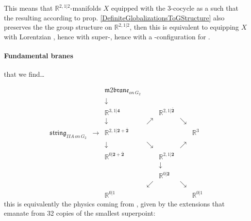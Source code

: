 \documentclass[12pt,titlepage]{article}
\newcommand{\itexarray}[1]{\begin{matrix}#1\end{matrix}}
\theoremstyle{plain}
\theoremstyle{definition}
\theoremstyle{remark}
\begin{document}
This means that $\mathbb{R}^{2,1|2}$-manifolds $X$ equipped with the 3-cocycle as a  such that the resulting  according to prop. \ref{DefiniteGlobalizationsToGStructure} also preserves the the group structure on $\mathbb{R}^{2,1|2}$, then this is equivalent to equipping $X$ with Lorentzian , hence with super-, hence with a -configuration for .

\hypertarget{fundamental_branes}{}\paragraph*{{Fundamental branes}}\label{fundamental_branes}

 that we find\ldots{}

\begin{displaymath}
\itexarray{
     && \mathfrak{m}2\mathfrak{brane}_{on\,G_2}
     \\
     && \downarrow
     \\
     && \mathbb{R}^{3,1|\mathbf{4}}  &&  \mathbb{R}^{2,1|\overline{\mathbf{2}}}
     \\
     && \downarrow & \nearrow&  & \searrow
     \\
     \mathfrak{string}_{IIA\,on\,G_2} &\longrightarrow& \mathbb{R}^{2,1|\mathbf{2}+\overline{\mathbf{2}}} &&  && \mathbb{R}^{3}
     \\
     && \downarrow &\searrow&  & \nearrow
     \\
     && \mathbb{R}^{0|\mathbf{2}+\overline{\mathbf{2}}} &&  \mathbb{R}^{2,1|\mathbf{2}}
     \\
     && && \downarrow
     \\
     && && \mathbb{R}^{0|\mathbf{2}}
     \\
     && & \swarrow && \searrow
     \\
     && \mathbb{R}^{0|1} && && \mathbb{R}^{0|1}
  }
\end{displaymath}
this is equivalently the physics coming from , given by the extensions that emanate from 32 copies of the smallest superpoint:
\end{document}
